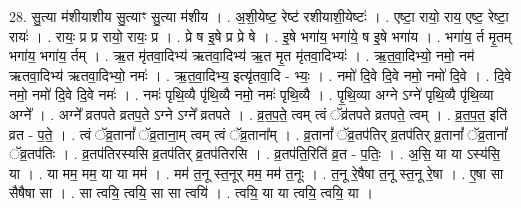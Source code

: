\documentclass[17pt]{extarticle}
\begin{document}
28. सु॒त्या म॑शीयाशीय सु॒त्याꣳ सु॒त्या म॑शीय । . अ॒शी॒येष्ट॒ रेष्ट॑ रशीयाशी॒येष्टः॑ । . एष्टा॒ रायो॒ राय॒ एष्ट॒ रेष्टा॒ रायः॑ । . रायः॒ प्र प्र रायो॒ रायः॒ प्र । . प्रे ष इ॒षे प्र प्रे षे । . इ॒षे भगा॑य॒ भगा॑ये॒ ष इ॒षे भगा॑य । . भगा॑य॒ र्त मृ॒तम् भगा॑य॒ भगा॑य॒ र्तम् । . ऋ॒त मृ॑तवा॒दिभ्य॑ ऋतवा॒दिभ्य॑ ऋ॒त मृ॒त मृ॑तवा॒दिभ्यः॑ । . ऋ॒त॒वा॒दिभ्यो॒ नमो॒ नम॑ ऋतवा॒दिभ्य॑ ऋतवा॒दिभ्यो॒ नमः॑ । . ऋ॒त॒वा॒दिभ्य॒ इत्यृ॑तवा॒दि - भ्यः॒ । . नमो॑ दि॒वे दि॒वे नमो॒ नमो॑ दि॒वे । . दि॒वे नमो॒ नमो॑ दि॒वे दि॒वे नमः॑ । . नमः॑ पृथि॒व्यै पृ॑थि॒व्यै नमो॒ नमः॑ पृथि॒व्यै । . पृ॒थि॒व्या अग्ने ऽग्ने॑ पृथि॒व्यै पृ॑थि॒व्या अग्ने᳚ । . अग्ने᳚ व्रतपते व्रतप॒ते ऽग्ने ऽग्ने᳚ व्रतपते । . व्र॒त॒प॒ते॒ त्वम् त्वं ॅव्र॑तपते व्रतपते॒ त्वम् । . व्र॒त॒प॒त॒ इति॑ व्रत - प॒ते॒ । . त्वं ॅव्र॒तानां᳚ ॅव्र॒ताना॒म् त्वम् त्वं ॅव्र॒ताना᳚म् । . व्र॒तानां᳚ ॅव्र॒तप॑तिर् व्र॒तप॑तिर् व्र॒तानां᳚ ॅव्र॒तानां᳚ ॅव्र॒तप॑तिः । . व्र॒तप॑तिरस्यसि व्र॒तप॑तिर् व्र॒तप॑तिरसि । . व्र॒तप॑ति॒रिति॑ व्र॒त - प॒तिः॒ । . अ॒सि॒ या या ऽस्य॑सि॒ या । . या मम॒ मम॒ या या मम॑ । . मम॑ त॒नू स्त॒नूर् मम॒ मम॑ त॒नूः । . त॒नू रे॒षैषा त॒नू स्त॒नू रे॒षा । . ए॒षा सा सैषैषा सा । . सा त्वयि॒ त्वयि॒ सा सा त्वयि॑ । . त्वयि॒ या या त्वयि॒ त्वयि॒ या । \newline
\end{document}
